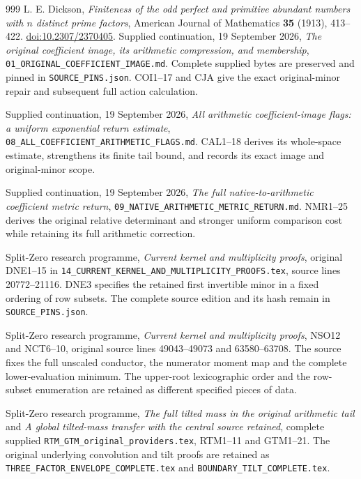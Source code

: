 \begin{thebibliography}{999}
L. E. Dickson,
\emph{Finiteness of the odd perfect and primitive abundant numbers
with \(n\) distinct prime factors},
American Journal of Mathematics \textbf{35} (1913), 413--422.
\href{https://doi.org/10.2307/2370405}{doi:10.2307/2370405}.
Supplied continuation, 19 September 2026,
\emph{The original coefficient image, its arithmetic compression,
and membership}, \texttt{01\_ORIGINAL\_COEFFICIENT\_IMAGE.md}.
Complete supplied bytes are preserved and pinned in
\texttt{SOURCE\_PINS.json}. COI1--17 and CJA give the exact
original-minor repair and subsequent full action calculation.

Supplied continuation, 19 September 2026,
\emph{All arithmetic coefficient-image flags: a uniform exponential
return estimate}, \texttt{08\_ALL\_COEFFICIENT\_ARITHMETIC\_FLAGS.md}.
CAL1--18 derives its whole-space estimate, strengthens its finite
tail bound, and records its exact image and original-minor scope.

Supplied continuation, 19 September 2026,
\emph{The full native-to-arithmetic coefficient metric return},
\texttt{09\_NATIVE\_ARITHMETIC\_METRIC\_RETURN.md}.
NMR1--25 derives the original relative determinant and stronger
uniform comparison cost while retaining its full arithmetic correction.

Split-Zero research programme, \emph{Current kernel and multiplicity
proofs}, original DNE1--15 in
\texttt{14\_CURRENT\_KERNEL\_AND\_MULTIPLICITY\_PROOFS.tex},
source lines 20772--21116. DNE3 specifies the retained first
invertible minor in a fixed ordering of row subsets. The complete
source edition and its hash remain in \texttt{SOURCE\_PINS.json}.

Split-Zero research programme, \emph{Current kernel and multiplicity
proofs}, NSO12 and NCT6--10, original source lines 49043--49073
and 63580--63708. The source fixes the full unscaled conductor,
the numerator moment map and the complete lower-evaluation minimum.
The upper-root lexicographic order and the row-subset enumeration
are retained as different specified pieces of data.

Split-Zero research programme, \emph{The full tilted mass in the
original arithmetic tail} and \emph{A global tilted-mass transfer
with the central source retained}, complete supplied
\texttt{RTM\_GTM\_original\_providers.tex}, RTM1--11 and GTM1--21.
The original underlying convolution and tilt proofs are retained
as \texttt{THREE\_FACTOR\_ENVELOPE\_COMPLETE.tex} and
\texttt{BOUNDARY\_TILT\_COMPLETE.tex}.


\end{thebibliography}
